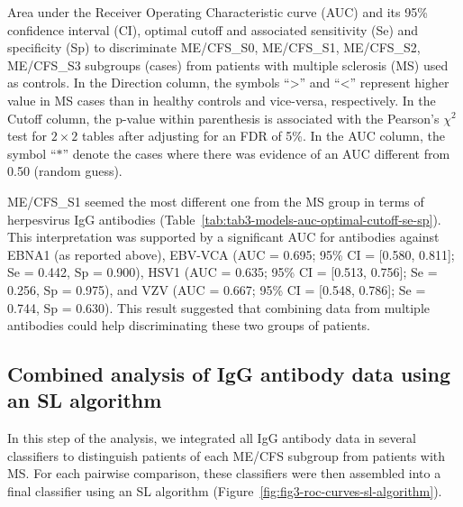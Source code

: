 \begin{table}
    \centering
    \caption[Area under the Receiver Operating Characteristic curve and its 95\% confidence interval, optimal cutoff and associated sensitivity and specificity to discriminate ME/CFS\_S0, ME/CFS\_S1, ME/CFS\_S2, ME/CFS\_S3 subgroups from patients with multiple sclerosis used as controls]{Area under the Receiver Operating Characteristic curve (AUC) and its 95\% confidence interval (CI), optimal cutoff and associated sensitivity (Se) and specificity (Sp) to discriminate ME/CFS\_S0, ME/CFS\_S1, ME/CFS\_S2, ME/CFS\_S3 subgroups (cases) from patients with multiple sclerosis (MS) used as controls. In the Direction column, the symbols ``{>}'' and ``{<}'' represent higher value in MS cases than in healthy controls and vice-versa, respectively. In the Cutoff column, the p-value within parenthesis is associated with the Pearson's $\chi^2$ test for $2 \times 2$ tables after adjusting for an FDR of 5\%. In the AUC column, the symbol ``{$\ast$}'' denote the cases where there was evidence of an AUC different from 0.50 (random guess).}
    \resizebox{0.98\linewidth}{!}{}
    \label{tab:tab3-models-auc-optimal-cutoff-se-sp}
\end{table}

ME/CFS\_S1 seemed the most different one from the MS group in terms of herpesvirus IgG antibodies (Table~\ref{tab:tab3-models-auc-optimal-cutoff-se-sp}). This interpretation was supported by a significant AUC for antibodies against EBNA1 (as reported above), EBV-VCA (AUC = 0.695; 95\% CI = [0.580, 0.811]; Se = 0.442, Sp = 0.900), HSV1 (AUC = 0.635; 95\% CI = [0.513, 0.756]; Se = 0.256, Sp = 0.975), and VZV (AUC = 0.667; 95\% CI = [0.548, 0.786]; Se = 0.744, Sp = 0.630). This result suggested that combining data from multiple antibodies could help discriminating these two groups of patients.

\subsection{Combined analysis of IgG antibody data using an SL algorithm}

In this step of the analysis, we integrated all IgG antibody data in several classifiers to distinguish patients of each ME/CFS subgroup from patients with MS. For each pairwise comparison, these classifiers were then assembled into a final classifier using an SL algorithm (Figure~\ref{fig:fig3-roc-curves-sl-algorithm}).

